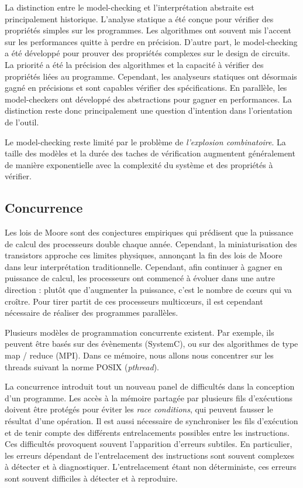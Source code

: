 La distinction entre le model-checking et l'interprétation abstraite est
principalement historique. L'analyse statique a été conçue pour vérifier
des propriétés simples sur les programmes. Les algorithmes ont souvent
mis l'accent sur les performances quitte à perdre en précision. D'autre
part, le model-checking a été développé pour prouver des propriétés
complexes sur le design de circuits. La priorité a été la précision des
algorithmes et la capacité à vérifier des propriétés liées au
programme. Cependant, les analyseurs statiques ont désormais gagné en
précisions et sont capables vérifier des spécifications. En parallèle, les
model-checkers ont développé des abstractions pour gagner en
performances. La distinction reste donc principalement une question
d'intention dans l'orientation de l'outil.

Le model-checking reste limité par le problème de \emph{l'explosion
combinatoire}. La taille des modèles et la durée des taches de
vérification augmentent généralement de manière exponentielle avec la
complexité du système et des propriétés à vérifier.

\subsection{Concurrence}

Les lois de Moore sont des conjectures empiriques qui prédisent que la
puissance de calcul des processeurs double chaque année. Cependant, la
miniaturisation des transistors approche ces limites physiques,
annonçant la fin des lois de Moore dans leur interprétation
traditionnelle. Cependant, afin continuer à gagner en puissance de
calcul, les processeurs ont commencé à évoluer dans une autre direction
: plutôt que d'augmenter la puissance, c'est le nombre de cœurs qui va
croître. Pour tirer partit de ces processeurs multicœurs, il est
cependant nécessaire de réaliser des programmes parallèles.

Plusieurs modèles de programmation concurrente existent. Par exemple, ils
peuvent être basés sur des évènements (SystemC), ou sur des algorithmes
de type map / reduce (MPI). Dans ce mémoire, nous allons nous concentrer
sur les threads suivant la norme POSIX (\emph{pthread}).

La concurrence introduit tout un nouveau panel de difficultés dans la
conception d'un programme. Les accès à la mémoire partagée par plusieurs
fils d'exécutions doivent être protégés pour éviter les \emph{race conditions}, qui peuvent fausser le résultat d'une opération. Il est
aussi nécessaire de synchroniser les fils d'exécution et de tenir compte
des différents entrelacements possibles entre les instructions. Ces
difficultés provoquent souvent l'apparition d'erreurs subtiles. En
particulier, les erreurs dépendant de l'entrelacement des instructions
sont souvent complexes à détecter et à diagnostiquer. L'entrelacement
étant non déterministe, ces erreurs sont souvent difficiles à détecter
et à reproduire.

